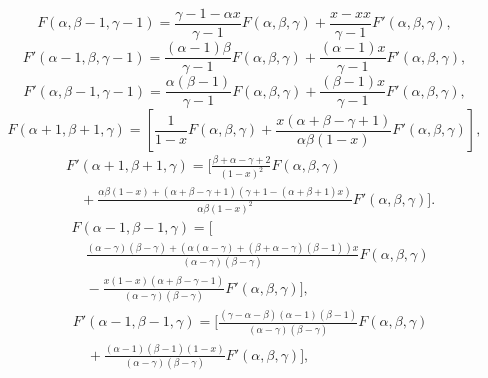 \begin{equation}
F(\alpha,\beta-1,\gamma-1)=\frac{\gamma-1-\alpha x}{\gamma-1}F(\alpha,\beta,\gamma)+\frac{x-xx}{\gamma-1}F'(\alpha,\beta,\gamma),\tag*{(19)}
\end{equation}
\begin{equation}
F'(\alpha-1,\beta,\gamma-1)=\frac{(\alpha-1)\beta}{\gamma-1}F(\alpha,\beta,\gamma)+\frac{(\alpha-1)x}{\gamma-1}F'(\alpha,\beta,\gamma),\tag*{(20)}
\end{equation}
\begin{equation}
F'(\alpha,\beta-1,\gamma-1)=\frac{\alpha(\beta-1)}{\gamma-1}F(\alpha,\beta,\gamma)+\frac{(\beta-1)x}{\gamma-1}F'(\alpha,\beta,\gamma),\tag*{(21)}
\end{equation}
\begin{equation}
F(\alpha+1,\beta+1,\gamma)=\left[\frac{1}{1-x}F(\alpha,\beta,\gamma)+\frac{x(\alpha+\beta-\gamma+1)}{\alpha\beta(1-x)}F'(\alpha,\beta,\gamma)\right],\tag*{(22)}
\end{equation}
\begin{equation}
\begin{aligned}
&F'(\alpha+1,\beta+1,\gamma)=\Biggl[\frac{\beta+\alpha-\gamma+2}{(1-x)^2}F(\alpha,\beta,\gamma)\\[.7em]
&\quad+\frac{\alpha\beta(1-x)+(\alpha+\beta-\gamma+1)(\gamma+1-(\alpha+\beta+1)x)}{\alpha\beta(1-x)^2}F'(\alpha,\beta,\gamma)\Biggr].
\end{aligned}\tag*{(23)}
\end{equation}
\clearpage{}
\begin{equation}
\begin{aligned}
&F(\alpha-1,\beta-1,\gamma)=\Biggl[\\[.5em]
&\quad\frac{(\alpha-\gamma)(\beta-\gamma)+(\alpha(\alpha-\gamma)+(\beta+\alpha-\gamma)(\beta-1))x}{(\alpha-\gamma)(\beta-\gamma)}F(\alpha,\beta,\gamma)\\[.7em]
&\quad-\frac{x(1-x)(\alpha+\beta-\gamma-1)}{(\alpha-\gamma)(\beta-\gamma)}F'(\alpha,\beta,\gamma)\Biggr],
\end{aligned}\tag*{(24)}
\end{equation}
\begin{equation}
\begin{aligned}
&F'(\alpha-1,\beta-1,\gamma)=\Biggl[\frac{(\gamma-\alpha-\beta)(\alpha-1)(\beta-1)}{(\alpha-\gamma)(\beta-\gamma)}F(\alpha,\beta,\gamma)\\[.7em]
&\quad+\frac{(\alpha-1)(\beta-1)(1-x)}{(\alpha-\gamma)(\beta-\gamma)}F'(\alpha,\beta,\gamma)\Biggr],
\end{aligned}\tag*{(25)}
\end{equation}
